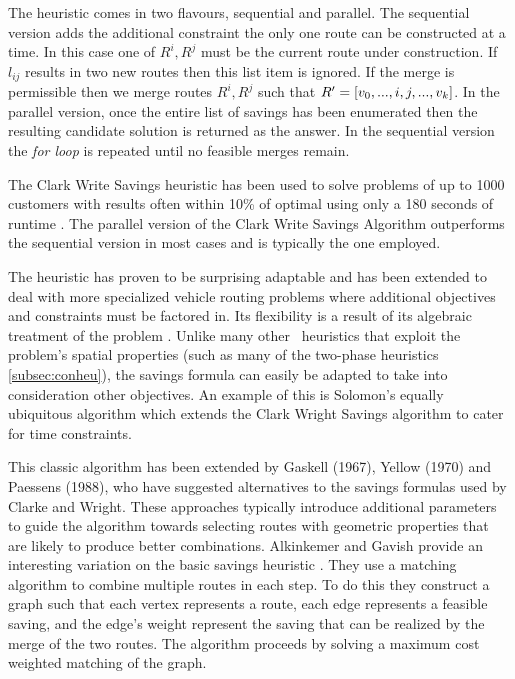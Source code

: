 The heuristic comes in two flavours, sequential and parallel. The sequential version adds the additional constraint the only one route can be constructed at a time. In this case one of $R^i, R^j$ must be the current route under construction. If $l_{ij}$ results in two new routes then this list item is ignored. If the merge is permissible then we merge routes $R^i, R^j$ such that $R' = [v_0,...,i,j,...,v_k]$. In the parallel version, once the entire list of savings has been enumerated then the resulting candidate solution is returned as the answer. In the sequential version the \emph{for loop} is repeated until no feasible merges remain.

The Clark Write Savings heuristic has been used to solve problems of up to 1000 customers with results often within 10\% of optimal using only a 180 seconds of runtime \cite{TV2001}. The parallel version of the Clark Write Savings Algorithm outperforms the sequential version in most cases\cite{Laporte:1999} and is typically the one employed.

The heuristic has proven to be surprising adaptable and has been extended to deal with more specialized vehicle routing problems where additional objectives and constraints must be factored in. Its flexibility is a result of its algebraic treatment of the problem \cite{Laporte:1999}. Unlike many other \VRP\ heuristics that exploit the problem's spatial properties (such as many of the two-phase heuristics \ref{subsec:conheu}), the savings formula can easily be adapted to take into consideration other objectives. An example of this is Solomon's equally ubiquitous algorithm \cite{Solomon:1987} which extends the Clark Wright Savings algorithm to cater for time constraints. 

This classic algorithm has been extended by Gaskell (1967), Yellow (1970) and Paessens (1988), who have suggested alternatives to the savings formulas used by Clarke and Wright. These approaches typically introduce additional parameters to guide the algorithm towards selecting routes with geometric properties that are likely to produce better combinations. Alkinkemer and Gavish provide an interesting variation on the basic savings heuristic \cite{AG:1991}. They use a matching algorithm to combine multiple routes in each step. To do this they construct a graph such that each vertex represents a route, each edge represents a feasible saving, and the edge's weight represent the saving that can be realized by the merge of the two routes. The algorithm proceeds by solving a maximum cost weighted matching of the graph.

